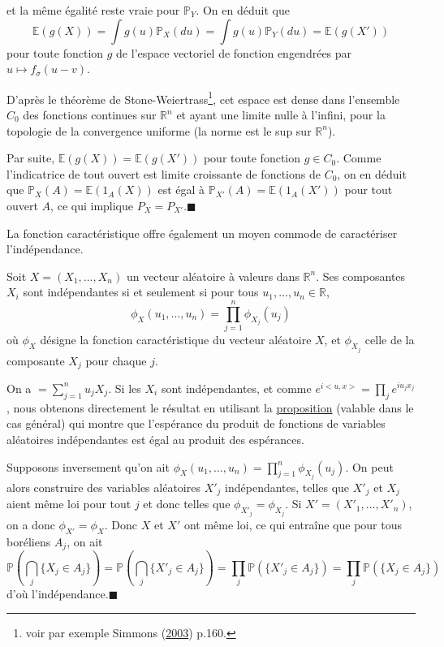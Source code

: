 \begin{preuve}
et la même égalité reste vraie pour \(\mathbb{P}_{Y}\). On en déduit que
\[\mathbb{E}(g(X)) = \int g(u) \mathbb{P}_X (du) = \int g(u) \mathbb{P}_Y (du) = \mathbb{E}(g(X'))\]
pour toute fonction \(g\) de l'espace vectoriel de fonction engendrées
par \(u \mapsto f_\sigma (u-v)\).

D'après le théorème de Stone-Weiertrass\footnote{voir par exemple
  Simmons (\protect\hyperlink{refIV-Simmons}{2003}) p.160.}, cet espace
est dense dans l'ensemble \(C_0\) des fonctions continues sur
\(\mathbb{R}^n\) et ayant une limite nulle à l'infini, pour la topologie
de la convergence uniforme (la norme est le sup sur \(\mathbb{R}^n\)).

Par suite, \(\mathbb{E}(g(X)) = \mathbb{E}(g(X'))\) pour toute fonction
\(g \in C_0\). Comme l'indicatrice de tout ouvert est limite croissante
de fonctions de \(C_0\), on en déduit que
\(\mathbb{P}_X(A) = \mathbb{E}(1_A (X))\) est égal à
\(\mathbb{P}_{X'}(A) = \mathbb{E}(1_A (X'))\) pour tout ouvert \(A\), ce
qui implique \(P_X = P_{X'}\).\hfill$\blacksquare$
\end{preuve}

La fonction caractéristique offre également un moyen commode de
caractériser l'indépendance.

\begin{corollaire}\label{IV-corollaire}
Soit \(X = (X_1,\ldots,X_n)\) un vecteur aléatoire à valeurs dans
\(\mathbb{R}^n\). Ses composantes \(X_i\) sont indépendantes si et
seulement si pour tous \(u_1, \ldots, u_n \in \mathbb{R}\),
\[ \phi_X(u_1,\ldots,u_n) = \prod_{j=1}^n \phi_{X_j}(u_j) \] où
\(\phi_X\) désigne la fonction caractéristique du vecteur aléatoire
\(X\), et \(\phi_{X_j}\) celle de la composante \(X_j\) pour chaque
\(j\).
\end{corollaire}

\begin{preuve}
On a \(< u,X> = \sum_{j=1}^n u_j X_j\). Si les \(X_i\) sont
indépendantes, et comme \(e^{i < u,x>} = \prod_j e^{i u_j x_j}\), nous
obtenons directement le résultat en utilisant la
\href{Probabilité\%20II.pdf\%20\#indep_fct}{proposition} (valable dans
le cas général) qui montre que l'espérance du produit de fonctions de
variables aléatoires indépendantes est égal au produit des espérances.

Supposons inversement qu'on ait
\(\phi_X (u_1,\ldots,u_n) = \prod_{j=1}^n \phi_{X_j}(u_j)\). On peut
alors construire des variables aléatoires \(X'_j\) indépendantes, telles
que \(X'_j\) et \(X_j\) aient même loi pour tout \(j\) et donc telles
que \(\phi_{X'_j} = \phi_{X_j}\). Si \(X' = (X'_1,\ldots,X'_n)\), on a
donc \(\phi_{X'} = \phi_X\). Donc \(X\) et \(X'\) ont même loi, ce qui
entraîne que pour tous boréliens \(A_j\), on ait
\[ \mathbb{P}(\bigcap_j \{X_j \in A_j\}) = \mathbb{P}(\bigcap_j \{X'_j \in A_j\}) = \prod_j \mathbb{P}(\{X'_j \in A_j\}) = \prod_j \mathbb{P}(\{X_j \in A_j\})\]
d'où l'indépendance.\hfill$\blacksquare$
\end{preuve}


